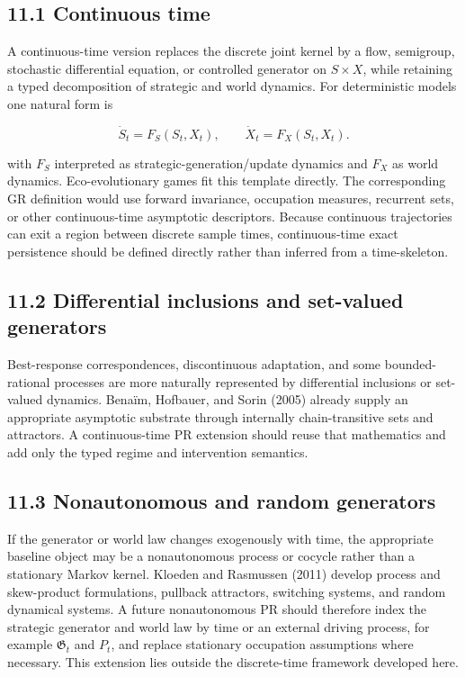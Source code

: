 \documentclass[10pt]{article}
\begin{document}
\subsection{11.1 Continuous time}\label{continuous-time}

A continuous-time version replaces the discrete joint kernel by a flow,
semigroup, stochastic differential equation, or controlled generator on
\(S\times{}X\), while retaining a typed decomposition of strategic and
world dynamics. For deterministic models one natural form is

\begin{equation}
\dot S_t=F_S(S_t,X_t),\qquad \dot X_t=F_X(S_t,X_t).
\tag{21}\label{eq:21}
\end{equation}

with \(F_S\) interpreted as strategic-generation/update dynamics and
\(F_X\) as world dynamics. Eco-evolutionary games fit this template
directly. The corresponding GR definition would use forward invariance,
occupation measures, recurrent sets, or other continuous-time asymptotic
descriptors. Because continuous trajectories can exit a region between
discrete sample times, continuous-time exact persistence should be
defined directly rather than inferred from a time-skeleton.

\subsection{11.2 Differential inclusions and set-valued
generators}\label{differential-inclusions-and-set-valued-generators}

Best-response correspondences, discontinuous adaptation, and some
bounded-rational processes are more naturally represented by
differential inclusions or set-valued dynamics. Benaïm, Hofbauer, and
Sorin (2005) already supply an appropriate asymptotic substrate through
internally chain-transitive sets and attractors. A continuous-time PR
extension should reuse that mathematics and add only the typed regime
and intervention semantics.

\subsection{11.3 Nonautonomous and random
generators}\label{nonautonomous-and-random-generators}

If the generator or world law changes exogenously with time, the
appropriate baseline object may be a nonautonomous process or cocycle
rather than a stationary Markov kernel. Kloeden and Rasmussen (2011)
develop process and skew-product formulations, pullback attractors,
switching systems, and random dynamical systems. A future nonautonomous
PR should therefore index the strategic generator and world law by time
or an external driving process, for example \(\mathfrak G_t\) and
\(P_t\), and replace stationary occupation assumptions where necessary.
This extension lies outside the discrete-time framework developed here.
\end{document}
